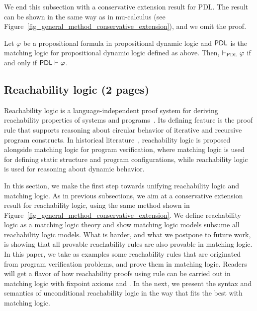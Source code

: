 \documentclass{amsart}
\begin{document}
We end this subsection with a conservative extension result for PDL.
The result can be shown in the same way as in mu-calculus 
(see Figure~\ref{fig_general_method_conservative_extension}),
and we omit the proof.
\begin{theorem}
Let $\varphi$ be a propositional formula in propositional dynamic logic
and $\mathsf{PDL}$ is the matching logic for propositional dynamic logic defined as above.
Then, $\vdash_{\textsc{PDL}}\varphi$ if and only if $\mathsf{PDL} \vdash \varphi$.
\end{theorem}

\subsection{Reachability logic (2 pages)}

Reachability logic is a language-independent proof system for deriving reachability properties
of systems and programs~\cite{bibid}.
Its defining feature is the \circularity proof rule that supports reasoning about
circular behavior of iterative and recursive program constructs.
In historical literature~\cite{bibid},
reachability logic is proposed alongside matching logic for program verification,
where matching logic is used for defining static structure and
program configurations, while reachability logic is used for reasoning about dynamic behavior.


In this section, we make the first step towards 
unifying reachability logic and matching logic.
As in previous subsections, we aim at a conservative extension result
for reachability logic,
using the same method shown in 
Figure~\ref{fig_general_method_conservative_extension}.
We define reachability logic as a matching logic theory
and show 
matching logic models subsume all reachability logic models.
What is harder, and what we postpone to future work,
is showing that 
all provable reachability rules are also provable in matching logic.
In this paper, we take as examples some reachability rules that are
originated from program verification problems,
and prove them in matching logic.
Readers will get a flavor of how reachability proofs using \circularity rule
can be  carried out in matching logic with fixpoint axioms \Fix and \Lfp.
In the next, we present the syntax and semantics of unconditional reachability 
logic in the way that fits the best with matching logic.
\end{document}
